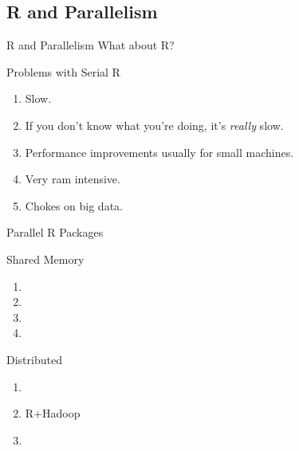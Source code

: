\subsection{R and Parallelism}


\begin{frame}
  \begin{block}{R and Parallelism}\pause
  What about R?
  \end{block}
\end{frame}

\begin{frame}
  \begin{block}{Problems with Serial R}\pause
  \begin{enumerate}[<+-|alert@+>]
    \item Slow.
    \item If you don't know what you're doing, it's \emph{really} slow.
    \item Performance improvements usually for small machines.
    \item Very ram intensive.
    \item Chokes on big data.
  \end{enumerate}
  \end{block}
\end{frame}


\begin{frame}
  \begin{block}{Parallel R Packages}
   \begin{center}
    \begin{minipage}{.45\textwidth}
    \begin{block}{Shared Memory}
      \begin{enumerate}[<+-|alert@+>]
        \item {}
        \item {}
        \item {}
        \item {}
      \end{enumerate}
    \end{block}
    \end{minipage}
    \hspace{.2cm}
    \begin{minipage}{.45\textwidth}
    \begin{block}{Distributed}
      \begin{enumerate}[<+-|alert@+>]
        \item {}
        \item R+Hadoop
        \item {}
      \end{enumerate}
    \end{block}
    \end{minipage}
    \end{center}
    \end{block}
\end{frame}



